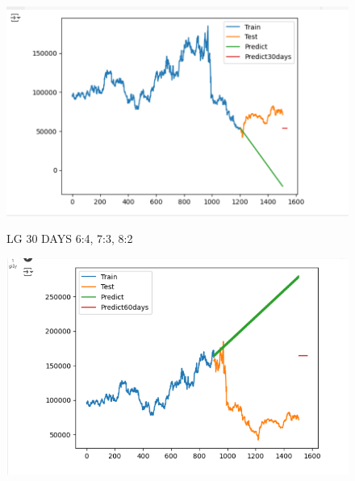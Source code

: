 \documentclass{article}
\begin{document}
\begin{multicols}{2}
\begin{figure}[H]
\begin{minipage}{0.15\textwidth}
    \label{fig:2}
    \end{minipage}%
    \begin{minipage}{0.15\textwidth}
    \centering
    \includegraphics[width=1\textwidth]{Image/ARIMA/30_8_2_LG_Arima.png}

    \label{fig:3}
    \end{minipage}
    \caption{LG 30 DAYS  6:4, 7:3, 8:2 }
\end{figure}

\begin{figure}[H]
    \centering
    \begin{minipage}{0.15\textwidth}
    \centering
    \includegraphics[width=1\textwidth]{Image/ARIMA/60_6_4_LG_Arima.png}
   

\end{minipage}
\end{figure}
\end{multicols}
\end{document}
